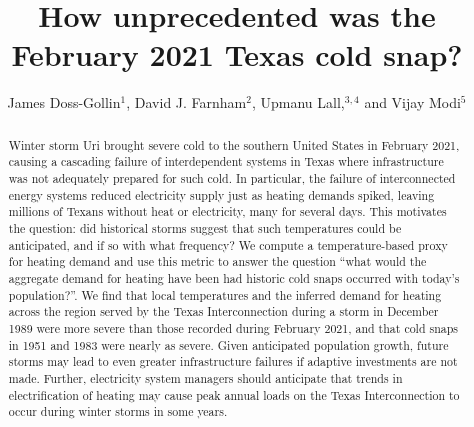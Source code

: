 \documentclass[12pt]{iopart}
\begin{document}
\title{How unprecedented was the February 2021 Texas cold snap?}

\author{James Doss-Gollin$^1$, David J. Farnham$^2$, Upmanu Lall,$^{3,4}$ and Vijay Modi$^5$}
\address{$^1$ Department of Civil and Environmental Engineering, Rice University, Houston, TX, USA (ORCID 0000-0002-3428-2224)}
\address{$^2$ Department of Global Ecology, Carnegie Institution for Science, Stanford, CA, USA (ORCID 0000-0002-6690-4251)}
\address{$^3$ Columbia Water Center, Columbia University, New York, NY, USA (ORCID 0000-0003-0529-8128)}
\address{$^4$ Department of Earth and Environmental Engineering, Columbia University, New York, NY, USA}
\address{$^4$ Department of Mechanical Engineering, Columbia University, New York, NY, USA (ORCID 0000-0003-2513-0437)}
\vspace{10pt}

\begin{abstract}
  Winter storm Uri brought severe cold to the southern United States in February 2021, causing a cascading failure of interdependent systems in Texas where infrastructure was not adequately prepared for such cold.
  In particular, the failure of interconnected energy systems reduced electricity supply just as heating demands spiked, leaving millions of Texans without heat or electricity, many for several days.
  This motivates the question: did historical storms suggest that such temperatures could be anticipated, and if so with what frequency?
  We compute a temperature-based proxy for heating demand and use this metric to answer the question ``what would the aggregate demand for heating have been had historic cold snaps occurred with today's population?''.
  We find that local temperatures and the inferred demand for heating across the region served by the Texas Interconnection during a storm in December 1989 were more severe than those recorded during February 2021, and that cold snaps in 1951 and 1983 were nearly as severe.
  Given anticipated population growth, future storms may lead to even greater infrastructure failures if adaptive investments are not made.
  Further, electricity system managers should anticipate that trends in electrification of heating may cause peak annual loads on the Texas Interconnection to occur during winter storms in some years.
\end{abstract}

\submitto{\ERL}
\maketitle
\end{document}
